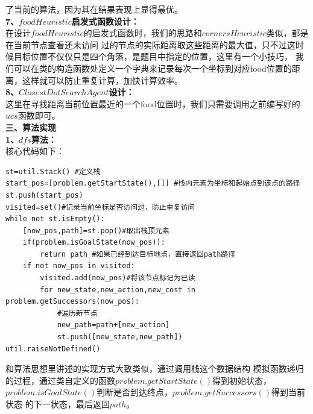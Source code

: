 \documentclass[a4paper,12pt,UTF8]{article}
\begin{document}
\begin{flushleft}
{{        了当前的算法，因为其在结果表现上显得最优。\\
    }
    \large{
        \hspace{1cm}\textbf{7、$foodHeuristic$启发式函数设计：\\}
    }
    \normalsize{
        \hspace{1cm}在设计$foodHeuristic$的启发式函数时，我们的思路和$cornersHeuristic$类似，都是在当前节点查看还未访问
        过的节点的实际距离取这些距离的最大值，只不过这时候目标位置不仅仅只是四个角落，是题目中指定的位置，这里有一个小技巧，
        我们可以在类的构造函数处定义一个字典来记录每次一个坐标到对应food位置的距离，这样就可以防止重复计算，加快计算效率。\\
    }
    \large{
        \hspace{1cm}\textbf{8、$ClosestDotSearchAgent$设计：\\}
    }
    \normalsize{
        \hspace{1cm}这里在寻找距离当前位置最近的一个food位置时，我们只需要调用之前编写好的$ucs$函数即可。\\
    }
    \Large{
        \textbf{
            三、算法实现\\
        }
    }
    \large{
        \hspace{1cm}\textbf{1、$dfs$算法：\\}
    }
    \normalsize{
        \hspace{1cm}核心代码如下：\\
    }
    \scriptsize{
        \begin{lstlisting}
st=util.Stack() #定义栈
start_pos=[problem.getStartState(),[]] #栈内元素为坐标和起始点到该点的路径
st.push(start_pos)
visited=set()#记录当前坐标是否访问过，防止重复访问
while not st.isEmpty():
    [now_pos,path]=st.pop()#取出栈顶元素
    if(problem.isGoalState(now_pos)):
        return path #如果已经到达目标地点，直接返回path路径
    if not now_pos in visited:
        visited.add(now_pos)#将该节点标记为已读
        for new_state,new_action,new_cost in problem.getSuccessors(now_pos):
            #遍历新节点
            new_path=path+[new_action]
            st.push([new_state,new_path])
util.raiseNotDefined()
        \end{lstlisting}
    }
    \normalsize{
        \hspace{1cm}和算法思想里讲述的实现方式大致类似，通过调用栈这个数据结构
        模拟函数递归的过程，通过类自定义的函数$problem.getStartState()$得到初始状态，
        $problem.isGoalState()$判断是否到达终点，$ problem.getSuccessors()$得到当前状态
        的下一状态，最后返回$path$。\\
}}
\end{flushleft}
\end{document}
